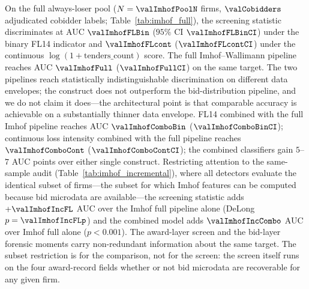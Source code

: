 On the full always-loser pool ($N=\valImhofPoolN$ firms,
$\valCobidders$ adjudicated cobidder labels;
Table~\ref{tab:imhof_full}), the screening statistic
discriminates at AUC $\valImhofFLBin$ ($95\%$ CI
$\valImhofFLBinCI$) under the binary FL14 indicator and
$\valImhofFLcont$ ($\valImhofFLcontCI$) under the continuous
$\log(1+\text{tenders\_count})$ score. The full Imhof--Wallimann
pipeline reaches AUC $\valImhofFull$ ($\valImhofFullCI$) on the
same target. The two pipelines reach statistically
indistinguishable discrimination on different data envelopes;
the construct does not outperform the bid-distribution pipeline,
and we do not claim it does---the architectural point is that
comparable accuracy is achievable on a substantially thinner
data envelope. FL14 combined with the full Imhof pipeline
reaches AUC $\valImhofComboBin$ ($\valImhofComboBinCI$);
continuous loss intensity combined with the full pipeline
reaches $\valImhofComboCont$ ($\valImhofComboContCI$); the
combined classifiers gain $5$--$7$ AUC points over either single
construct. Restricting attention to the same-sample audit
(Table~\ref{tab:imhof_incremental}), where all detectors
evaluate the identical subset of firms---the subset for which
Imhof features can be computed because bid microdata are
available---the screening statistic adds $+\valImhofIncFL$ AUC
over the Imhof full pipeline alone (DeLong
$p = \valImhofIncFLp$) and the combined model adds
$\valImhofIncCombo$ AUC over Imhof full alone ($p < 0.001$). The
award-layer screen and the bid-layer forensic moments carry
non-redundant information about the same target. The subset
restriction is for the comparison, not for the screen: the screen
itself runs on the four award-record fields whether or not bid
microdata are recoverable for any given firm.



